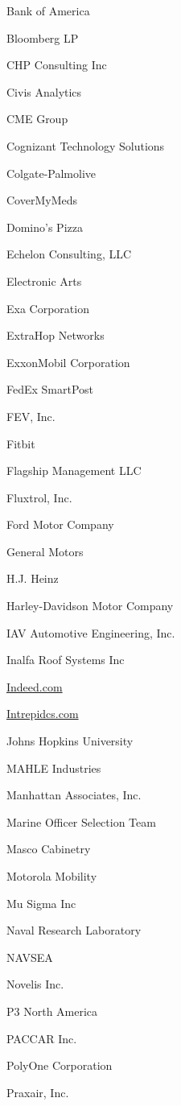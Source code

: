 \documentclass[twoside]{article}
\begin{document}
\begin{center}
\begin{multicols}{5}
\begin{FlushLeft}
\begin{compactitem}
\item Bank of America
\item Bloomberg LP
\item CHP Consulting Inc
\item Civis Analytics
\item CME Group
\item Cognizant Technology Solutions
\item Colgate-Palmolive
\item CoverMyMeds
\item Domino's Pizza
\item Echelon Consulting, LLC
\item Electronic Arts
\item Exa Corporation
\item ExtraHop Networks
\item ExxonMobil Corporation
\item FedEx SmartPost
\item FEV, Inc.
\item Fitbit
\item Flagship Management LLC
\item Fluxtrol, Inc.
\item Ford Motor Company
\item General Motors
\item H.J. Heinz
\item Harley-Davidson Motor Company
\item IAV Automotive Engineering, Inc.
\item Inalfa Roof Systems Inc
\item \url{Indeed.com}
\item \url{Intrepidcs.com}
\item Johns Hopkins University
\item MAHLE Industries
\item Manhattan Associates, Inc.
\item Marine Officer Selection Team
\item Masco Cabinetry
\item Motorola Mobility
\item Mu Sigma Inc
\item Naval Research Laboratory
\item NAVSEA
\item Novelis Inc.
\item P3 North America
\item PACCAR Inc.
\item PolyOne Corporation
\item Praxair, Inc.

\end{compactitem}
\end{FlushLeft}
\end{multicols}
\end{center}
\end{document}
